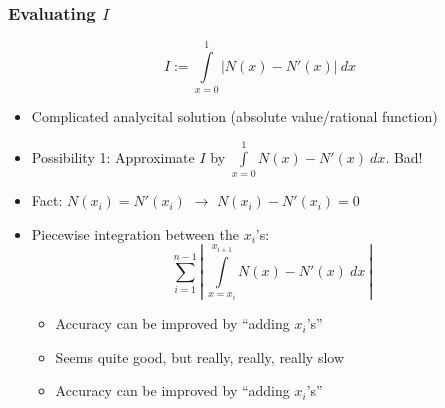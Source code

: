 \documentclass{beamer}
\begin{document}
\begin{frame}
  \frametitle{Evaluating $I$}
  \begin{equation*}
    I := \int\limits_{x=0}^1 | N(x) - N'(x) |\ dx
  \end{equation*}
  \begin{itemize}
  \item Complicated analycital solution (absolute value/rational function)
  \item Possibility 1: Approximate $I$ by $\int\limits_{x=0}^1 N(x) - N'(x) \  dx$. Bad!
  \item Fact: $N(x_i) = N'(x_i)$
    $\rightarrow$ $N(x_i) - N'(x_i) = 0$
  \item Piecewise integration between the $x_i$'s:
    \begin{equation*}
      \sum\limits_{i=1}^{n-1} \left|\ \int\limits_{x=x_i}^{x_{i+1}} N(x) - N'(x) \  dx\ \right|
    \end{equation*}
    \begin{itemize}
    \item Accuracy can be improved by ``adding $x_i$'s''
    \item Seems quite good, but really, really, really slow
    \item Accuracy can be improved by ``adding $x_i$'s''
    \end{itemize}
  \end{itemize}
\end{frame}
\end{document}
